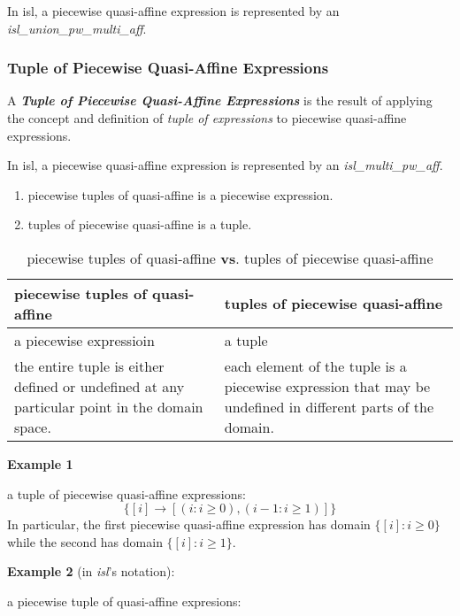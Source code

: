 In isl, a piecewise quasi-affine expression is represented by an \textcolor{pg}{\emph{isl\_union\_pw\_multi\_aff}}.

\subsubsection{Tuple of Piecewise Quasi-Affine Expressions}

A \textcolor{vr}{\textbf{\emph{Tuple of Piecewise Quasi-Affine Expressions}}} is the result of applying the concept and definition of \emph{tuple of expressions} to piecewise quasi-affine expressions.

In isl, a piecewise quasi-affine expression is represented by an \textcolor{pg}{\emph{isl\_multi\_pw\_aff}}.

\begin{info}{}
  \begin{enumerate}
    \item piecewise tuples of quasi-affine is a piecewise expression.
    \item tuples of piecewise quasi-affine is a tuple.
  \end{enumerate}
\end{info}

\begin{table}
  \centering
  \caption{piecewise tuples of quasi-affine \textbf{vs}. tuples of piecewise quasi-affine}
  \begin{tabular}{p{7cm}p{7cm}}
    \toprule
    \textbf{piecewise tuples of quasi-affine} & \textbf{tuples of piecewise quasi-affine} \\
    \midrule
    a piecewise expressioin & a tuple \\
    the entire tuple is either defined or undefined at any particular point in the domain space.&
    each element of the tuple is a piecewise expression that may be undefined in different parts of the domain. \\
    \bottomrule
  \end{tabular}
\end{table}

\textbf{Example 1}

a tuple of piecewise quasi-affine expressions:
$$\{ [i] \rightarrow [(i : i\ge 0), (i - 1 : i \ge 1)] \}$$
In particular, the first piecewise quasi-affine expression has domain $\{[i]:i\ge 0\}$ while the second has domain $\{[i]:i\ge 1\}$.

\textbf{Example 2} (in \emph{isl}'s notation):

a piecewise tuple of quasi-affine expresions:

